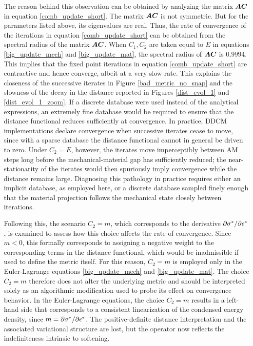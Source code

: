 \documentclass[10pt]{cas-sc}
\newcommand{\deleted}[1]{}
\newcommand{\added}[1]{#1}
\begin{document}
The reason behind this observation can be obtained by analyzing the matrix $\mbox{\boldmath $A$} \mbox{\boldmath $C$}$ in equation \eqref{comb_update_short}. The matrix $\mbox{\boldmath $A$} \mbox{\boldmath $C$}$ is not symmetric. But for the parameters listed above, its eigenvalues are real. Thus, the rate of convergence of the iterations in equation \eqref{comb_update_short} can be obtained from the spectral radius of the matrix $\mbox{\boldmath $A$}  \mbox{\boldmath $C$}$. When $C_1,C_2$ are taken equal to $E$ in equations \eqref{big_update_mech} and \eqref{big_update_mat}, the spectral radius of $\mbox{\boldmath $A$} \mbox{\boldmath $C$}$ is $0.9994$. This implies that the fixed point iterations in equation \eqref{comb_update_short} are contractive and hence converge, albeit at a very slow rate. This explains the closeness of the successive iterates in Figure \ref{bad_metric_no_snap} \added{and the slowness of the decay in the distance reported in Figures \ref{dist_evol_1} and \ref{dist_evol_1_zoom}}. If a discrete database were used instead of the analytical expressions, an extremely fine database would be required to ensure that the distance functional reduces sufficiently at convergence. \added{In practice, DDCM implementations declare convergence when successive iterates cease to move, since with a sparse database the distance functional cannot in general be driven to zero. Under $C_2 = E$, however, the iterates move imperceptibly between AM steps long before the mechanical-material gap has sufficiently reduced; the near-stationarity of the iterates would then spuriously imply convergence while the distance remains large. Diagnosing this pathology in practice requires either an implicit database, as employed here, or a discrete database sampled finely enough that the material projection follows the mechanical state closely between iterations.}

Following this, the scenario $C_2 = m$, \added{which corresponds to the derivative $\partial {\sigma}^*/ \partial {\epsilon} ^*$}, is examined to assess how this choice affects the rate of convergence. Since $m < 0$, this formally corresponds to assigning a negative weight to the corresponding terms in the distance functional, which would be inadmissible if used to define the metric itself. For this reason, $C_2 = m$ is employed only in the Euler-Lagrange equations \eqref{big_update_mech} and \eqref{big_update_mat}. \deleted{Convergence can still be evaluated exclusively using the distance functional \eqref{1D_short_dist_func} with $C_2 = E$.} The choice $C_2 = m$ therefore does not alter the underlying metric and should be interpreted solely as an algorithmic modification used to probe its effect on convergence behavior. In the Euler-Lagrange equations, the choice $C_2=m$ results in a left-hand side that corresponds to a consistent linearization of the condensed energy density, since $m=\partial {\sigma}^*/ \partial {\epsilon} ^*$. The positive-definite distance interpretation and the associated variational structure are lost, but the operator now reflects the indefiniteness intrinsic to softening.
\end{document}
